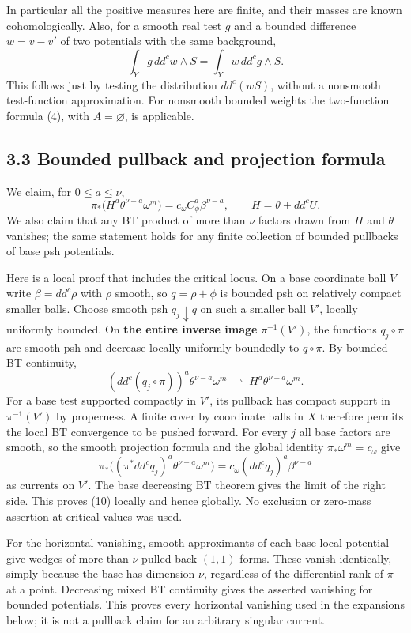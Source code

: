 \documentclass[
  11pt,
]{article}
\begin{document}
In particular all the positive measures here are finite, and their masses are known cohomologically. Also, for a smooth real test \(g\) and a bounded difference \(w=v-v'\) of two potentials with the same background, \[
\int_Yg\,dd^c w\wedge S=\int_Yw\,dd^c g\wedge S.                   \tag{9}
\] This follows just by testing the distribution \(dd^c(wS)\), without a nonsmooth test-function approximation. For nonsmooth bounded weights the two-function formula (4), with \(A=\varnothing\), is applicable.

\subsection{3.3 Bounded pullback and projection formula}\label{bounded-pullback-and-projection-formula}

We claim, for \(0\leq a\leq\nu\), \[
\pi_*\big(H^a\theta^{\nu-a}\omega^m\big)
=c_\omega C_\phi^a\beta^{\nu-a},\qquad H=\theta+dd^cU.               \tag{10}
\] We also claim that any BT product of more than \(\nu\) factors drawn from \(H\) and \(\theta\) vanishes; the same statement holds for any finite collection of bounded pullbacks of base psh potentials.

Here is a local proof that includes the critical locus. On a base coordinate ball \(V\) write \(\beta=dd^c\rho\) with \(\rho\) smooth, so \(q=\rho+\phi\) is bounded psh on relatively compact smaller balls. Choose smooth psh \(q_j\downarrow q\) on such a smaller ball \(V'\), locally uniformly bounded. On \textbf{the entire inverse image} \(\pi^{-1}(V')\), the functions \(q_j\circ\pi\) are smooth psh and decrease locally uniformly boundedly to \(q\circ\pi\). By bounded BT continuity, \[
(dd^c(q_j\circ\pi))^a\theta^{\nu-a}\omega^m
\ \rightharpoonup\ H^a\theta^{\nu-a}\omega^m.
\] For a base test supported compactly in \(V'\), its pullback has compact support in \(\pi^{-1}(V')\) by properness. A finite cover by coordinate balls in \(X\) therefore permits the local BT convergence to be pushed forward. For every \(j\) all base factors are smooth, so the smooth projection formula and the global identity \(\pi_*\omega^m=c_\omega\) give \[
\pi_*\big((\pi^*dd^c q_j)^a\theta^{\nu-a}\omega^m\big)
=c_\omega (dd^c q_j)^a\beta^{\nu-a}
\] as currents on \(V'\). The base decreasing BT theorem gives the limit of the right side. This proves (10) locally and hence globally. No exclusion or zero-mass assertion at critical values was used.

For the horizontal vanishing, smooth approximants of each base local potential give wedges of more than \(\nu\) pulled-back \((1,1)\) forms. These vanish identically, simply because the base has dimension \(\nu\), regardless of the differential rank of \(\pi\) at a point. Decreasing mixed BT continuity gives the asserted vanishing for bounded potentials. This proves every horizontal vanishing used in the expansions below; it is not a pullback claim for an arbitrary singular current.
\end{document}

